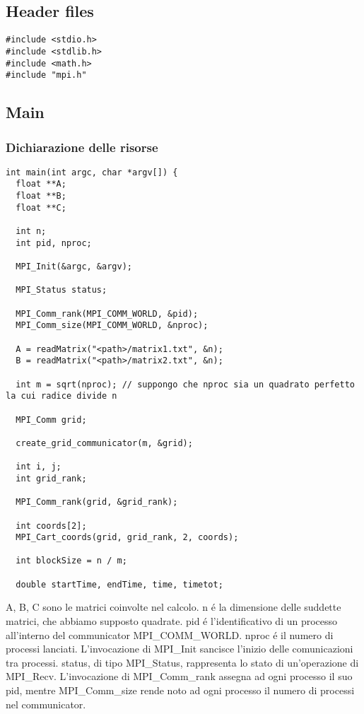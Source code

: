 \subsection{Header files}
\begin{lstlisting}
#include <stdio.h>
#include <stdlib.h>
#include <math.h>
#include "mpi.h"
\end{lstlisting}

\subsection{Main}
\subsubsection{Dichiarazione delle risorse}
\begin{lstlisting}
int main(int argc, char *argv[]) {
  float **A;
  float **B;
  float **C;

  int n;
  int pid, nproc;

  MPI_Init(&argc, &argv);

  MPI_Status status;

  MPI_Comm_rank(MPI_COMM_WORLD, &pid);
  MPI_Comm_size(MPI_COMM_WORLD, &nproc);

  A = readMatrix("<path>/matrix1.txt", &n);
  B = readMatrix("<path>/matrix2.txt", &n);

  int m = sqrt(nproc); // suppongo che nproc sia un quadrato perfetto la cui radice divide n

  MPI_Comm grid;

  create_grid_communicator(m, &grid);

  int i, j;
  int grid_rank;

  MPI_Comm_rank(grid, &grid_rank);

  int coords[2];
  MPI_Cart_coords(grid, grid_rank, 2, coords);

  int blockSize = n / m;

  double startTime, endTime, time, timetot;
\end{lstlisting}
A, B, C sono le matrici coinvolte nel calcolo.
n é la dimensione delle suddette matrici, che abbiamo supposto quadrate.
pid é l'identificativo di un processo all'interno del communicator MPI\_COMM\_WORLD.
nproc é il numero di processi lanciati.
L'invocazione di MPI\_Init sancisce l'inizio delle comunicazioni tra processi.
status, di tipo MPI\_Status, rappresenta lo stato di un'operazione di MPI\_Recv.
L'invocazione di MPI\_Comm\_rank assegna ad ogni processo il suo pid, mentre MPI\_Comm\_size rende noto ad ogni processo il numero di processi nel communicator.
